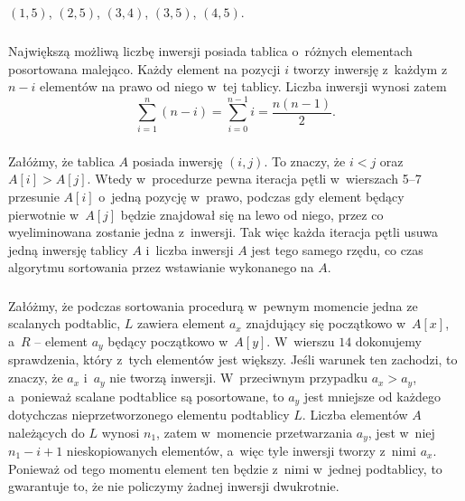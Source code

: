 \subsection{} %

\subsubsection{} %
$(1,5)$, $(2,5)$, $(3,4)$, $(3,5)$, $(4,5)$.

\subsubsection{} %
Największą możliwą liczbę inwersji posiada tablica o~różnych elementach posortowana malejąco. Każdy element na pozycji $i$ tworzy inwersję z~każdym z~$n-i$ elementów na prawo od niego w~tej tablicy. Liczba inwersji wynosi zatem
\[
	\sum_{i=1}^n(n-i) = \sum_{i=0}^{n-1}i = \frac{n(n-1)}{2}.
\]

\subsubsection{} %
Załóżmy, że tablica $A$ posiada inwersję $(i,j)$. To znaczy, że $i<j$ oraz $A[i]>A[j]$. Wtedy w~procedurze  pewna iteracja pętli  w~wierszach 5--7 przesunie $A[i]$ o~jedną pozycję w~prawo, podczas gdy element będący pierwotnie w~$A[j]$ będzie znajdował się na lewo od niego, przez co wyeliminowana zostanie jedna z~inwersji. Tak więc każda iteracja pętli  usuwa jedną inwersję tablicy $A$ i~liczba inwersji $A$ jest tego samego rzędu, co czas algorytmu sortowania przez wstawianie wykonanego na $A$.

\subsubsection{} %
Załóżmy, że podczas sortowania procedurą  w~pewnym momencie jedna ze scalanych podtablic, $L$ zawiera element $a_x$ znajdujący się początkowo w~$A[x]$, a~$R$ -- element $a_y$ będący początkowo w~$A[y]$. W~wierszu $14$ dokonujemy sprawdzenia, który z~tych elementów jest większy. Jeśli warunek ten zachodzi, to znaczy, że $a_x$ i~$a_y$ nie tworzą inwersji. W~przeciwnym przypadku $a_x>a_y$, a~ponieważ scalane podtablice są posortowane, to $a_y$ jest mniejsze od każdego dotychczas nieprzetworzonego elementu podtablicy $L$. Liczba elementów $A$ należących do $L$ wynosi $n_1$, zatem w~momencie przetwarzania $a_y$, jest w~niej $n_1-i+1$ nieskopiowanych elementów, a~więc tyle inwersji tworzy z~nimi $a_x$. Ponieważ od tego momentu element ten będzie z~nimi w~jednej podtablicy, to gwarantuje to, że nie policzymy żadnej inwersji dwukrotnie.

